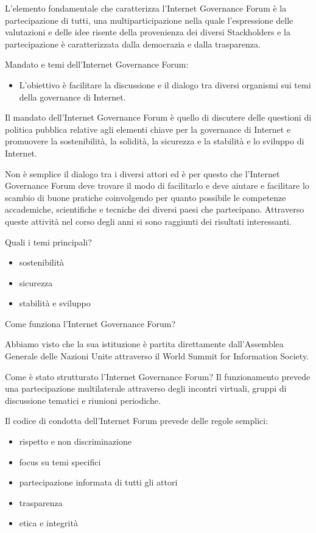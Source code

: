 L'elemento fondamentale che caratterizza l'Internet Governance Forum è la partecipazione di tutti, una multiparticipazione nella quale l'espressione delle valutazioni e delle idee risente della provenienza dei diversi Stackholders e la partecipazione è caratterizzata dalla democrazia e dalla trasparenza. \par

Mandato e temi dell'Internet Governance Forum:

\begin{itemize}
    \item L'obiettivo è facilitare la discussione e il dialogo tra diversi organismi sui temi della governance di Internet.
\end{itemize}

Il mandato dell'Internet Governance Forum è quello di discutere delle questioni di politica pubblica relative agli elementi chiave per la governance di Internet e promuovere la sostenibilità, la solidità, la sicurezza e la stabilità e lo sviluppo di Internet.

Non è semplice il dialogo tra i diversi attori ed è per questo che l'Internet Governance Forum deve trovare il modo di facilitarlo e deve aiutare e facilitare lo scambio di buone pratiche coinvolgendo per quanto possibile le competenze accademiche, scientifiche e tecniche dei diversi paesi che partecipano. Attraverso queste attività nel corso degli anni si sono raggiunti dei risultati interessanti.

Quali i temi principali?

\begin{itemize}
    \item sostenibilità
    \item sicurezza
    \item stabilità e sviluppo
\end{itemize}

Come funziona l'Internet Governance Forum?

Abbiamo visto che la sua istituzione è partita direttamente dall'Assemblea Generale delle Nazioni Unite attraverso il World Summit for Information Society.

Come è stato strutturato l'Internet Governance Forum? Il funzionamento prevede una partecipazione multilaterale attraverso degli incontri virtuali, gruppi di discussione tematici e riunioni periodiche. 

Il codice di condotta dell'Internet Forum prevede delle regole semplici:

\begin{itemize}
    \item rispetto e non discriminazione
    \item focus su temi specifici
    \item partecipazione informata di tutti gli attori
    \item trasparenza
    \item etica e integrità
\end{itemize}

